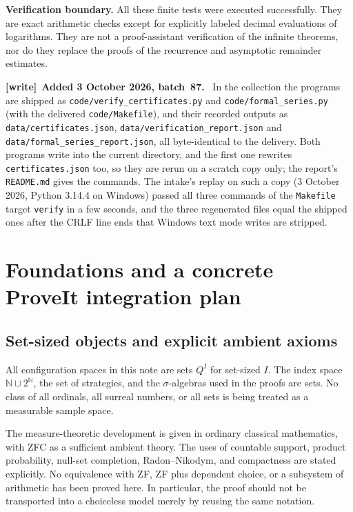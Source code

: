 \documentclass[11pt,letterpaper]{article}
\theoremstyle{definition}
\newcommand{\N}{\mathbb N}
\newenvironment{writenote}[1][]{\par\smallskip\begingroup\small
 \noindent\textbf{[write]}\if\relax\detokenize{#1}\relax\else~\textbf{#1.}\fi\ }%
 {\par\endgroup\smallskip}
\begin{document}
\begin{resultbox}
\textbf{Verification boundary.} All these finite tests were executed successfully. They are exact arithmetic checks except for explicitly labeled decimal evaluations of logarithms. They are not a proof-assistant verification of the infinite theorems, nor do they replace the proofs of the recurrence and asymptotic remainder estimates.
\end{resultbox}

\begin{writenote}[Added 3 October 2026, batch~87]
In the collection the programs are shipped as \texttt{code/\allowbreak verify\_\allowbreak certificates.py} and \texttt{code/\allowbreak formal\_\allowbreak series.py} (with the delivered \texttt{code/\allowbreak Makefile}), and their recorded outputs as \texttt{data/\allowbreak certificates.json}, \texttt{data/\allowbreak verification\_\allowbreak report.json} and \texttt{data/\allowbreak formal\_\allowbreak series\_\allowbreak report.json}, all byte-identical to the delivery. Both programs write into the current directory, and the first one rewrites \texttt{certificates.json} too, so they are rerun on a scratch copy only; the report's \texttt{README.md} gives the commands. The intake's replay on such a copy (3 October 2026, Python 3.14.4 on Windows) passed all three commands of the \texttt{Makefile} target \texttt{verify} in a few seconds, and the three regenerated files equal the shipped ones after the CRLF line ends that Windows text mode writes are stripped.
\end{writenote}

\section{Foundations and a concrete ProveIt integration plan}
\label{mbg:sec:foundations}

\subsection{Set-sized objects and explicit ambient axioms}
All configuration spaces in this note are sets $Q^I$ for set-sized $I$. The index space $\N\sqcup2^\N$, the set of strategies, and the $\sigma$-algebras used in the proofs are sets. No class of all ordinals, all surreal numbers, or all sets is being treated as a measurable sample space.

The measure-theoretic development is given in ordinary classical mathematics, with ZFC as a sufficient ambient theory. The uses of countable support, product probability, null-set completion, Radon--Nikodym, and compactness are stated explicitly. No equivalence with ZF, ZF plus dependent choice, or a subsystem of arithmetic has been proved here. In particular, the proof should not be transported into a choiceless model merely by reusing the same notation.
\end{document}
